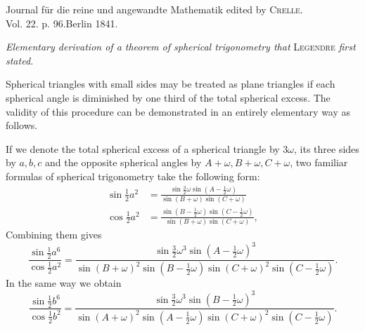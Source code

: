 \clearpage
{}
\begin{center}Journal für die reine und angewandte Mathematik edited by \textsc{Crelle}.\\
Vol. 22. p. 96.\quad Berlin 1841.\end{center}
\begin{center}\textit{Elementary derivation of a theorem of spherical trigonometry that} \textsc{Legendre} \textit{first stated.}\end{center}
\noindent\hspace*{1.2em}Spherical triangles with small sides may be treated as plane triangles if each spherical angle is diminished by one third of the total spherical excess. The validity of this procedure can be demonstrated in an entirely elementary way as follows.

If we denote the total spherical excess of a spherical triangle by $3\omega$, its three sides by $a,b,c$ and the opposite spherical angles by $A+\omega,B+\omega,C+\omega$, two familiar formulas of spherical trigonometry take the following form:
\[
\begin{aligned}
\sin\tfrac12 a^2&=\frac{\sin\tfrac32\omega\sin(A-\tfrac12\omega)}{\sin(B+\omega)\sin(C+\omega)}\\[5pt]
\cos\tfrac12 a^2&=\frac{\sin(B-\tfrac12\omega)\sin(C-\tfrac12\omega)}{\sin(B+\omega)\sin(C+\omega)},
\end{aligned}
\]
\noindent Combining them gives
\[
\frac{\sin\tfrac12 a^6}{\cos\tfrac12 a^2}
=\frac{\sin\tfrac32\omega^3\sin(A-\tfrac12\omega)^3}
{\sin(B+\omega)^2\sin(B-\tfrac12\omega)\sin(C+\omega)^2\sin(C-\tfrac12\omega)}.
\]
\noindent In the same way we obtain
\[
\frac{\sin\tfrac12 b^6}{\cos\tfrac12 b^2}
=\frac{\sin\tfrac32\omega^3\sin(B-\tfrac12\omega)^3}
{\sin(A+\omega)^2\sin(A-\tfrac12\omega)\sin(C+\omega)^2\sin(C-\tfrac12\omega)}.
\]


